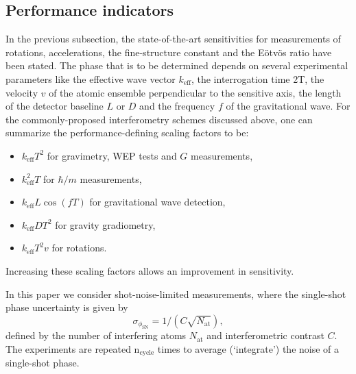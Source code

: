 \subsection{Performance indicators}
In the previous subsection, the state-of-the-art sensitivities for measurements of rotations, accelerations, the fine-structure constant and the E{\"o}tv{\"o}s ratio have been stated. The phase that is to be determined depends on several experimental parameters like the effective wave vector $k_\text{eff}$, the interrogation time 2T, the velocity $v$ of the atomic ensemble perpendicular to the sensitive axis, the length of the detector baseline $L$ or $D$ and the frequency $f$ of the gravitational wave. For the commonly-proposed interferometry schemes discussed above, one can summarize the performance-defining scaling factors to be:
    \begin{itemize}
        \item $k_\text{eff}T^2$ for gravimetry, WEP tests and $G$ measurements,
        
        \item $k_\text{eff}^2T$ for $\hbar/m$ measurements,
        
        \item $k_\text{eff}L\cos(f T)$ for gravitational wave detection,
        
        \item $k_\text{eff}DT^2$ for gravity gradiometry,
        
        \item $k_\text{eff}T^2v$ for rotations.
    \end{itemize}
Increasing these scaling factors allows an improvement in sensitivity.

In this paper we consider shot-noise-limited measurements, where the single-shot phase uncertainty is given by 
\begin{equation}
    \sigma_{\phi_\text{SN}}=1/(C\sqrt{N_\text{at}}),
\end{equation}
defined by the number of interfering atoms $N_\text{at}$ and interferometric contrast $C$. The experiments are repeated n$_\text{cycle}$ times to average (`integrate') the noise of a single-shot phase.

